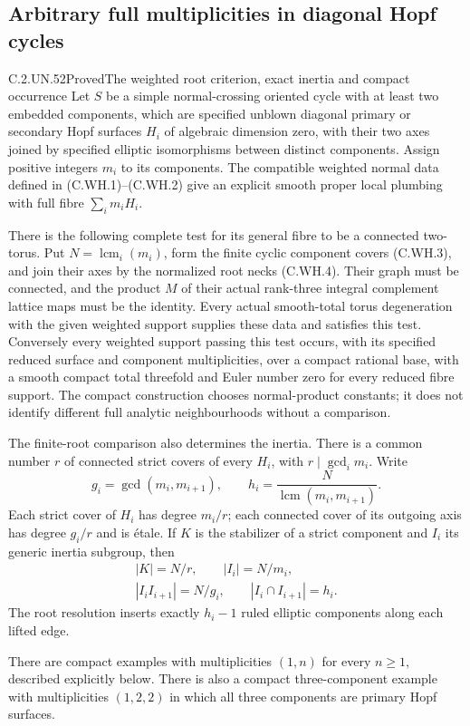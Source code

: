 \subsection{Arbitrary full multiplicities in diagonal Hopf cycles}

\begin{statement}{C.2.UN.52}{Proved}{The weighted root criterion, exact inertia and compact occurrence}
Let $S$ be a simple normal-crossing oriented cycle
with at least two embedded components, which are specified unblown
diagonal primary or secondary Hopf surfaces $H_i$
of algebraic dimension zero, with their two axes
joined by specified elliptic isomorphisms between distinct components.
Assign positive integers $m_i$ to its components.
The compatible weighted normal data defined in
(C.WH.1)--(C.WH.2) give an explicit smooth proper
local plumbing with full fibre $\sum_i m_iH_i$.

There is the following complete test for its
general fibre to be a connected two-torus.
Put $N=\operatorname{lcm}_i(m_i)$, form the finite
cyclic component covers (C.WH.3), and join their
axes by the normalized root necks (C.WH.4).
Their graph must be connected, and the product
$M$ of their actual rank-three integral complement
lattice maps must be the identity. Every actual
smooth-total torus degeneration with the given
weighted support supplies these data and satisfies
this test. Conversely every weighted support
passing this test occurs, with its specified
reduced surface and component multiplicities,
over a compact rational base, with a smooth
compact total threefold and Euler number zero
for every reduced fibre support. The compact
construction chooses normal-product constants;
it does not identify different full analytic
neighbourhoods without a comparison.

The finite-root comparison also determines the
inertia. There is a common number $r$ of connected
strict covers of every $H_i$, with
$r\mid\gcd_i m_i$. Write
\[
 g_i=\gcd(m_i,m_{i+1}),\qquad
 h_i=\frac{N}{\operatorname{lcm}(m_i,m_{i+1})}.
\]
Each strict cover of $H_i$ has degree $m_i/r$;
each connected cover of its outgoing axis has
degree $g_i/r$ and is \'{e}tale. If $K$ is the
stabilizer of a strict component and $I_i$
its generic inertia subgroup, then
\[
 \begin{gathered}
 |K|=N/r,\qquad |I_i|=N/m_i,\\
 |I_iI_{i+1}|=N/g_i,\qquad
 |I_i\cap I_{i+1}|=h_i.
 \end{gathered}
\tag{C.WH.0}
\]
The root resolution inserts exactly $h_i-1$
ruled elliptic components along each lifted edge.

There are compact examples with multiplicities
$(1,n)$ for every $n\ge1$, described explicitly
below. There is also a compact three-component
example with multiplicities $(1,2,2)$ in which
all three components are primary Hopf surfaces.
\end{statement}

